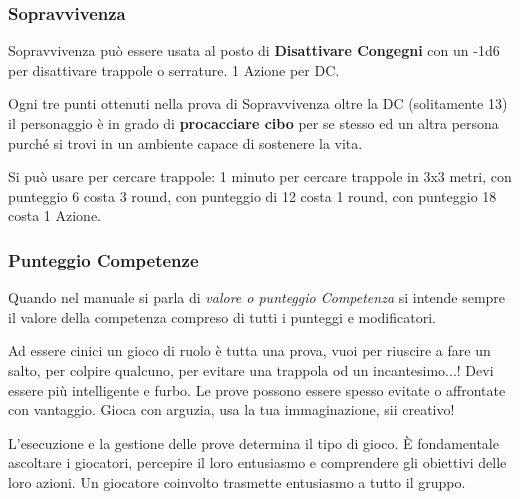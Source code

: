 \begin{multicols}{2}
\titlespacing*{\subsubsection}{0pt}{0.5em}{0.5em}\subsubsection*{Sopravvivenza}\label{sopravvivenza}

Sopravvivenza può essere usata al posto di \textbf{Disattivare Congegni} con un -1d6 per disattivare trappole o serrature. 1 Azione per DC.

Ogni tre punti ottenuti nella prova di Sopravvivenza oltre la DC (solitamente 13) il personaggio è in grado di \textbf{procacciare cibo} per se stesso ed un altra persona purché si trovi in un ambiente capace di sostenere la vita.

Si può usare per cercare trappole: 1 minuto per cercare trappole in 3x3 metri, con punteggio 6 costa 3 round, con punteggio di 12 costa 1 round, con punteggio 18 costa 1 Azione.

\subsubsection*{Punteggio Competenze}\label{Punteggio Competenze}

Quando nel manuale si parla di \emph{valore o punteggio Competenza} si intende sempre il valore della competenza compreso di tutti i punteggi e modificatori.

\begin{giocatore}
	Ad essere cinici un gioco di ruolo è tutta una prova, vuoi per riuscire a fare un salto, per colpire qualcuno, per evitare una trappola od un incantesimo...!
	Devi essere più intelligente e furbo. Le prove possono essere spesso evitate o affrontate con vantaggio. Gioca con arguzia, usa la tua immaginazione, sii creativo!
\end{giocatore}


\begin{narratore}
	L'esecuzione e la gestione delle prove determina il tipo di gioco. È fondamentale ascoltare i giocatori, percepire il loro entusiasmo e comprendere gli obiettivi delle loro azioni. Un giocatore coinvolto trasmette entusiasmo a tutto il gruppo.



\end{narratore}
\end{multicols}
